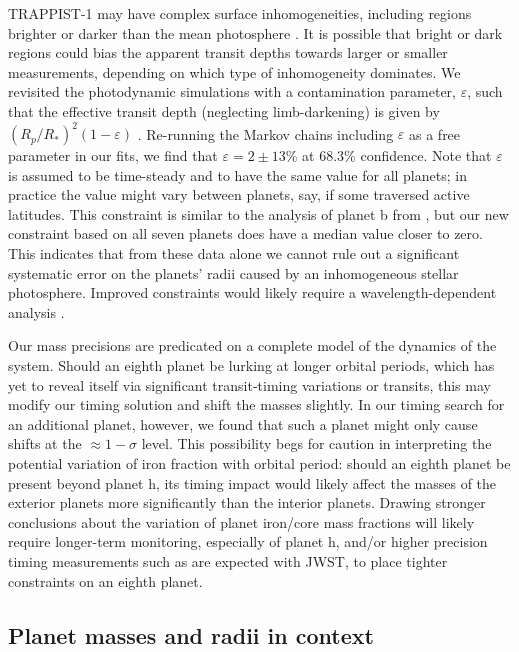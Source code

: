 \documentclass[fleqn,usenatbib]{mnras} %
\begin{document}
TRAPPIST-1 may have complex surface inhomogeneities, including regions brighter or darker than the mean photosphere  \citep{Morris2018d,Wakeford2019}. It is possible that bright or dark regions could bias the apparent transit depths towards larger or smaller measurements, depending on which type of inhomogeneity dominates. We revisited the photodynamic simulations with a contamination parameter,
$\varepsilon$, such that the effective transit depth (neglecting limb-darkening) is given by $(R_p/R_*)^2(1-\varepsilon)$ 
 \citep{Morris2018b,Morris2018c}.  Re-running the Markov chains 
including $\varepsilon$ as a free parameter in our fits, we
find that $\varepsilon = 2\pm 13$\% at 68.3\% confidence.  Note that $\varepsilon$ is assumed to be time-steady and to have the same value for all planets; in practice the value might vary between planets, say, if some traversed active latitudes.  
This constraint is similar to the analysis of planet b from \citet{Morris2018c}, but our new constraint based on all seven planets does have a median value closer to zero.
This indicates that from these data alone we cannot rule out a significant systematic error on the planets' radii caused by an inhomogeneous stellar photosphere.
Improved constraints would likely require a wavelength-dependent analysis \citep[e.g.][]{Rackham2018,Wakeford2019}.

Our mass precisions are predicated on a complete model of the dynamics of the system.  Should an eighth planet be lurking at longer orbital periods, which has yet to reveal itself via significant transit-timing variations or transits, this may modify our timing solution and shift the masses slightly.  In our timing search for an additional planet, however, we found that such a planet might only cause shifts at the ${\approx} 1{-}\sigma$ level.  This possibility begs for caution in interpreting the potential variation of iron fraction with orbital period:  should an eighth planet be present beyond planet h, its timing impact would likely affect the masses of the exterior planets more significantly than the interior planets.  Drawing stronger conclusions about the variation of planet iron/core mass fractions will likely require longer-term monitoring, especially of planet h, and/or higher precision timing measurements such as are expected with JWST, to place tighter constraints on an eighth planet.

\subsection{Planet masses and radii in context}
\end{document}
